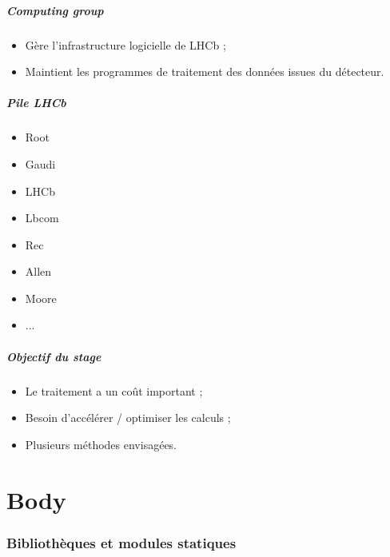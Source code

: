 \documentclass{beamer}
\begin{document}
\begin{frame}
    \frametitle{Computing group}

    \begin{itemize}
        \item Gère l'infrastructure logicielle de LHCb ;
        \item Maintient les programmes de traitement des données issues du détecteur.
    \end{itemize}
\end{frame}

\begin{frame}
    \frametitle{Pile LHCb}

    \begin{itemize}
        \item Root
        \item Gaudi
        \item LHCb
        \item Lbcom
        \item Rec
        \item Allen
        \item Moore
        \item ...
    \end{itemize}
\end{frame}

\begin{frame}
    \frametitle{Objectif du stage}

    \begin{itemize}
        \item Le traitement a un coût important ;
        \item Besoin d'accélérer / optimiser les calculs ;
        \item Plusieurs méthodes envisagées.
    \end{itemize}
\end{frame}


\part{Body}
\begin{frame}
    \tableofcontents
\end{frame}

\section{Bibliothèques et modules statiques}

\begin{frame}
    \tableofcontents[currentsection]
\end{frame}
\end{document}
